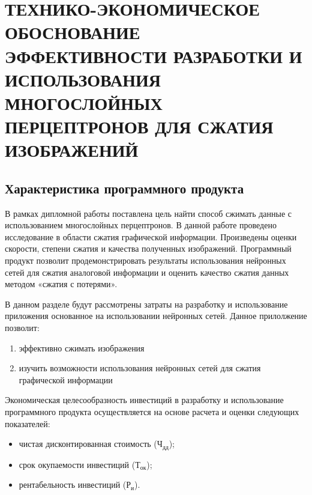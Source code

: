 \newcommand{\byr}{Br}

\section{ТЕХНИКО-ЭКОНОМИЧЕСКОЕ ОБОСНОВАНИЕ ЭФФЕКТИВНОСТИ РАЗРАБОТКИ И ИСПОЛЬЗОВАНИЯ МНОГОСЛОЙНЫХ ПЕРЦЕПТРОНОВ ДЛЯ СЖАТИЯ ИЗОБРАЖЕНИЙ}

\subsection{Характеристика программного продукта}

В рамках дипломной работы поставлена цель найти способ сжимать данные с использованием многослойных перцептронов. В данной работе проведено исследование в области сжатия графической информации. Произведены оценки скорости, степени сжатия и качества полученных изображений. Программный продукт позволит продемонстрировать результаты использования нейронных сетей для сжатия аналоговой информации и оценить качество сжатия данных методом «сжатия с потерями».

В данном разделе будут рассмотрены затраты на разработку и использование приложения основанное на использовании нейронных сетей. Данное прилолжение позволит:
\begin{enumerate}

  \item эффективно сжимать изображения

  \item изучить возможности использования нейронных сетей для сжатия графической информации

\end{enumerate}

Экономическая целесообразность инвестиций в разработку и использование программного продукта осуществляется на основе расчета и оценки следующих показателей:

\begin{itemize}

  \item чистая  дисконтированная стоимость ($ \text{Ч}_\text{дд} $);
  
  \item срок окупаемости инвестиций ($ \text{Т}_\text{ок} $);
  
  \item рентабельность инвестиций ($ \text{Р}_\text{и} $).
  
\end{itemize}

